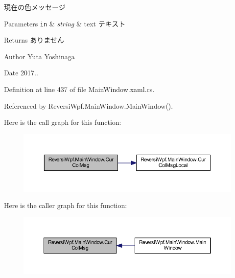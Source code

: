 現在の色メッセージ 


\begin{DoxyParams}[1]{Parameters}
\mbox{\tt in}  & {\em string} & text テキスト \\
\hline
\end{DoxyParams}
\begin{DoxyReturn}{Returns}
ありません 
\end{DoxyReturn}
\begin{DoxyAuthor}{Author}
Yuta Yoshinaga 
\end{DoxyAuthor}
\begin{DoxyDate}{Date}
2017.. 
\end{DoxyDate}


Definition at line 437 of file Main\+Window.\+xaml.\+cs.



Referenced by Reversi\+Wpf.\+Main\+Window.\+Main\+Window().

Here is the call graph for this function\+:
\nopagebreak
\begin{figure}[H]
\begin{center}
\leavevmode
\includegraphics[width=350pt]{class_reversi_wpf_1_1_main_window_a5dd2bbfd5f17c36d1b301fdb91b483ad_cgraph}
\end{center}
\end{figure}
Here is the caller graph for this function\+:
\nopagebreak
\begin{figure}[H]
\begin{center}
\leavevmode
\includegraphics[width=350pt]{class_reversi_wpf_1_1_main_window_a5dd2bbfd5f17c36d1b301fdb91b483ad_icgraph}
\end{center}
\end{figure}
\mbox{\label{class_reversi_wpf_1_1_main_window_a92d45fe8b0224e36ce974e04388ec541}} 

